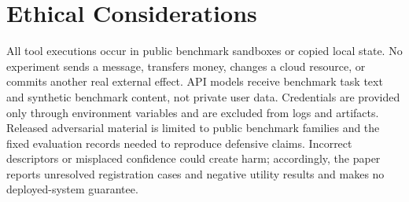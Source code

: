 \section{Ethical Considerations}

All tool executions occur in public benchmark sandboxes or copied local state.
No experiment sends a message, transfers money, changes a cloud resource, or
commits another real external effect.  API models receive benchmark task text
and synthetic benchmark content, not private user data.  Credentials are
provided only through environment variables and are excluded from logs and
artifacts.  Released adversarial material is limited to public benchmark
families and the fixed evaluation records needed to reproduce defensive
claims.  Incorrect descriptors or misplaced confidence could create harm;
accordingly, the paper reports unresolved registration cases and negative
utility results and makes no deployed-system guarantee.
